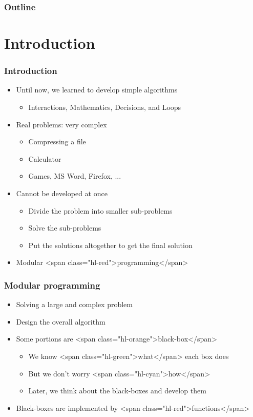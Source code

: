 \documentclass{../c-lecture}
\subtitle{Functions}
\begin{document}
\begin{frame}
  \titlepage{}
\end{frame}
\begin{frame}
  \frametitle{Outline}
  \tableofcontents{}
\end{frame}

\section{Introduction}

\begin{frame}
  \frametitle{Introduction}
  \begin{itemize}
    \item Until now, we learned to develop simple algorithms
    \begin{itemize}
      \item Interactions, Mathematics, Decisions, and Loops
    \end{itemize}
    \item Real problems: very complex
    \begin{itemize}
      \item Compressing a file
      \item Calculator
      \item Games, MS Word, Firefox, ...
    \end{itemize}
    \item Cannot be developed at once
    \begin{itemize}
      \item Divide the problem into smaller sub-problems
      \item Solve the sub-problems
      \item Put the solutions altogether to get the final solution
    \end{itemize}
    \item Modular <span class="hl-red">programming</span>
  \end{itemize}
\end{frame}
\begin{frame}
  \frametitle{Modular programming}
  \begin{itemize}
    \item Solving a large and complex problem
    \item Design the overall algorithm
    \item Some portions are <span class="hl-orange">black-box</span>
    \begin{itemize}
      \item We know <span class="hl-green">what</span> each box does
      \item But we don't worry <span class="hl-cyan">how</span>
      \item Later, we think about the black-boxes and develop them
    \end{itemize}
    \item
      Black-boxes are implemented by <span class="hl-red">functions</span>

  \end{itemize}
\end{frame}
\end{document}

